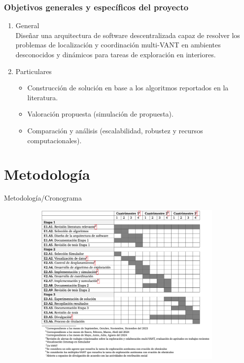 \documentclass[
	12pt, %
	aspectratio=169, %
]{beamer}
\begin{document}
\begin{frame}
  
  \frametitle{Objetivos generales y específicos del proyecto}

  \begin{enumerate}
  \item<1-> General \\
    Diseñar una arquitectura de software descentralizada capaz de resolver los problemas de localización y coordinación multi-VANT en ambientes desconocidos y dinámicos para tareas de exploración en interiores.
    \pause
  \item<2-> Particulares\\
    \begin{itemize}
    \item Construcción de solución en base a los algoritmos reportados en la literatura.
      \pause
    \item Valoración propuesta (simulación de propuesta).
      \pause
    \item Comparación y análisis (escalabilidad, robustez y recursos computacionales).
    \end{itemize}
    
  \end{enumerate}
\end{frame}

\section{Metodología}
\begin{frame}{Metodología/Cronograma}

  \begin{figure}
    \centering
    \includegraphics[width=11cm, height=8cm]{cronograma}
  \end{figure}
  
\end{frame}
\end{document}
